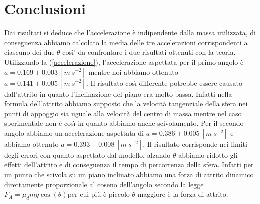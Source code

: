 \documentclass{article}
\begin{document}
	\section{Conclusioni}
		Dai risultati si deduce che l'accelerazione \`{e} indipendente dalla massa utilizzata, di conseguenza abbiamo calcolato la media delle tre accelerazioni corrispondenti a ciascuno dei due $\theta$ cosi' da confrontare i due risultati ottenuti con la teoria.
		Utilizzando la (\ref{accelerazione}), l'accelerazione aspettata per il primo angolo \`{e} $a = 0.169\pm0.003\:[m\:s^{-2}]$ mentre noi abbiamo ottenuto $a=0.141\pm0.005\:[m\:s^{-2}]$. Il risultato cos\`{\i} differente potrebbe essere causato dall'attrito in quanto l'inclinazione del piano era molto bassa. Infatti nella formula dell'attrito abbiamo supposto che la velocit\`{a} tangenziale della sfera nei punti di appoggio sia uguale alla velocità del centro di massa mentre nel caso sperimentale non è cos\`{\i} in quanto abbiamo anche scivolamento.
		Per il secondo angolo abbiamo un accelerazione aspettata di $a = 0.386\pm0.005\:[m\:s^{-2}]$ e abbiamo ottenuto $a=0.393\pm0.008\:[m\:s^{-2}]$. Il risultato corrisponde nei limiti degli errori con quanto aspettato dal modello, alzando $\theta$ abbiamo ridotto gli effetti dell'attrito e di conseguenza il tempo di percorrenza della sfera. Infatti per un punto che scivola su un piano inclinato abbiamo una forza di attrito dinamico direttamente proporzionale al coseno dell'angolo secondo la legge $F_A=μ_dmg\cos(\theta)$per cui pi\`{u} \`{e} piccolo $\theta$ maggiore \`{e} la forza di attrito.
			
		
\end{document}
